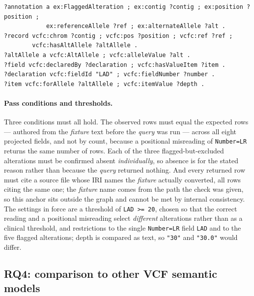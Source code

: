 \begin{lstlisting}[caption={The integration \emph{query}'s graph pattern, abridged: the annotation join on four literals, the declaration supplying the cardinality, and the depth reached through \term{forAllele}, which resolves the \texttt{Number=LR} frame of reference so the \emph{query} never handles the \texttt{LAA} indirection itself. Omitted: prefixes, the projection, the file/record/sample-call path, and the \texttt{FILTER} on depth.},label={lst:localallele}]
?annotation a ex:FlaggedAlteration ; ex:contig ?contig ; ex:position ?position ;
            ex:referenceAllele ?ref ; ex:alternateAllele ?alt .
?record vcfc:chrom ?contig ; vcfc:pos ?position ; vcfc:ref ?ref ;
        vcfc:hasAltAllele ?altAllele .
?altAllele a vcfc:AltAllele ; vcfc:alleleValue ?alt .
?field vcfc:declaredBy ?declaration ; vcfc:hasValueItem ?item .
?declaration vcfc:fieldId "LAD" ; vcfc:fieldNumber ?number .
?item vcfc:forAllele ?altAllele ; vcfc:itemValue ?depth .
\end{lstlisting}

\paragraph{Pass conditions and thresholds.}
Three conditions must all hold.
The observed rows must equal the expected rows --- authored from the \emph{fixture} text before the \emph{query} was run --- across all eight projected fields, and not by count, because a positional misreading of \texttt{Number=LR} returns the same number of rows.
Each of the three flagged-but-excluded alterations must be confirmed absent \emph{individually}, so absence is for the stated reason rather than because the \emph{query} returned nothing.
And every returned row must cite a source file whose IRI names the \emph{fixture} actually converted, all rows citing the same one; the \emph{fixture} name comes from the path the check was given, so this anchor sits outside the graph and cannot be met by internal consistency.
The settings in force are a threshold of \texttt{LAD >= 20}, chosen so that the correct reading and a positional misreading select \emph{different} alterations rather than as a clinical threshold, and restrictions to the single \texttt{Number=LR} field \texttt{LAD} and to the five flagged alterations; depth is compared as text, so \texttt{"30"} and \texttt{"30.0"} would differ.

\subsection{RQ4: comparison to other VCF semantic models}
\label{sec:m-rq4}


